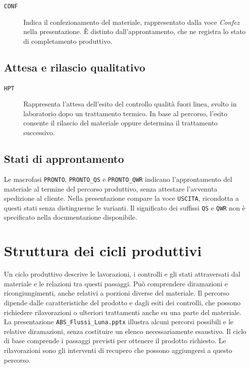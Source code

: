 \begin{description}
\item[\texttt{CONF}] Indica il confezionamento del materiale, rappresentato dalla voce \emph{Confez} nella presentazione. È distinto dall'approntamento, che ne registra lo stato di completamento produttivo.
\end{description}

\subsection{Attesa e rilascio qualitativo}

\begin{description}
\item[\texttt{HPT}] Rappresenta l'attesa dell'esito del controllo qualità fuori linea, svolto in laboratorio dopo un trattamento termico. In base al percorso, l'esito consente il rilascio del materiale oppure determina il trattamento successivo.
\end{description}

\subsection{Stati di approntamento}

Le macrofasi \texttt{PRONTO}, \texttt{PRONTO\_QS} e \texttt{PRONTO\_QWR} indicano l'approntamento del materiale al termine del percorso produttivo, senza attestare l'avvenuta spedizione al cliente. Nella presentazione compare la voce \texttt{USCITA}, ricondotta a questi stati senza distinguerne le varianti. Il significato dei suffissi \texttt{QS} e \texttt{QWR} non è specificato nella documentazione disponibile.

\section{Struttura dei cicli produttivi}
\label{sec:base-production-cycles}

Un ciclo produttivo descrive le lavorazioni, i controlli e gli stati attraversati dal materiale e le relazioni tra questi passaggi. Può comprendere diramazioni e ricongiungimenti, anche relativi a porzioni diverse del materiale. Il percorso dipende dalle caratteristiche del prodotto e dagli esiti dei controlli, che possono richiedere rilavorazioni o ulteriori trattamenti anche su una parte del materiale. La presentazione \texttt{ABS\_Flussi\_Luna.pptx} illustra alcuni percorsi possibili e le relative diramazioni, senza costituire un elenco necessariamente esaustivo. Il ciclo di base comprende i passaggi previsti per ottenere il prodotto richiesto. Le rilavorazioni sono gli interventi di recupero che possono aggiungersi a questo percorso.

